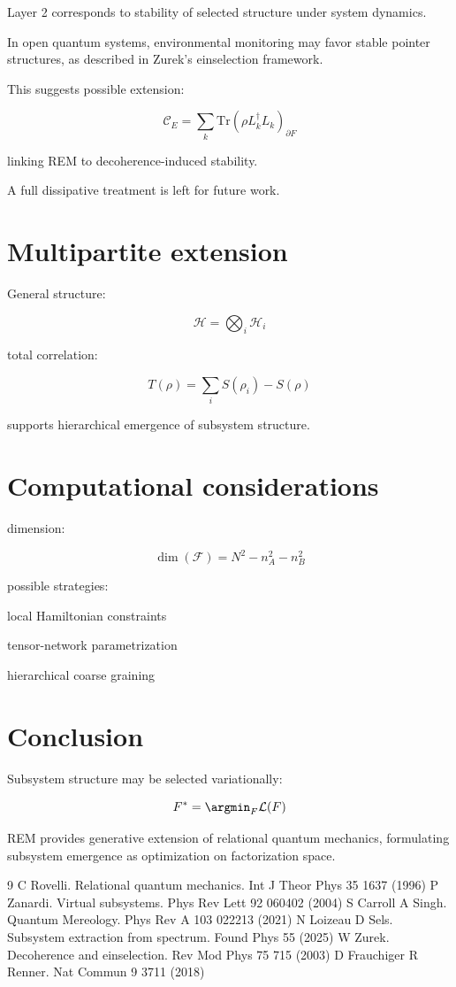 \documentclass[11pt]{article}
\begin{document}
Layer 2 corresponds to stability of selected structure
under system dynamics.

In open quantum systems,
environmental monitoring may favor stable pointer structures,
as described in Zurek's einselection framework.

This suggests possible extension:

\[
\mathcal C_E
=
\sum_k
\mathrm{Tr}
(
\rho
L_k^\dagger L_k
)_{\partial F}
\]

linking REM to decoherence-induced stability.

A full dissipative treatment is left for future work.

\section{Multipartite extension}

General structure:

\[
\mathcal H
=
\bigotimes_i \mathcal H_i
\]

total correlation:

\[
T(\rho)
=
\sum_i S(\rho_i)-S(\rho)
\]

supports hierarchical emergence of subsystem structure.

\section{Computational considerations}

dimension:

\[
\dim(\mathcal F)
=
N^2-n_A^2-n_B^2
\]

possible strategies:

local Hamiltonian constraints

tensor-network parametrization

hierarchical coarse graining

\section{Conclusion}

Subsystem structure may be selected variationally:

\[
F^*
=
\argmin_F
\mathcal L(F)
\]

REM provides generative extension of relational quantum mechanics,
formulating subsystem emergence as optimization on factorization space.

\begin{thebibliography}{9}
 C Rovelli. Relational quantum mechanics. Int J Theor Phys 35 1637 (1996)
 P Zanardi. Virtual subsystems. Phys Rev Lett 92 060402 (2004)
 S Carroll A Singh. Quantum Mereology. Phys Rev A 103 022213 (2021)
 N Loizeau D Sels. Subsystem extraction from spectrum. Found Phys 55 (2025)
 W Zurek. Decoherence and einselection. Rev Mod Phys 75 715 (2003)
 D Frauchiger R Renner. Nat Commun 9 3711 (2018)
\end{thebibliography}
\end{document}
